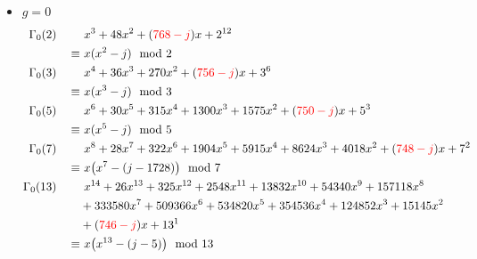 \documentclass{rs}
\theoremstyle{definition}
\theoremstyle{remark}
\newcommand{\md}{~~{\rm mod}~}
\newcommand{\G}{\Gamma}
\renewcommand{\=}{\approx}
\renewcommand{\-}{\sim}
\newcommand{\rd}[1]{{\textcolor{red}{#1}}}
\numberwithin{equation}{section}
\begin{document}
\begin{itemize}
 \item $g = 0$ 
 \[
  \begin{split}
    \G_0(2) \qquad & ~ x^3+48 x^2+(\rd{768-j}) x+2^{12} \\
            \equiv & ~ x (x^2 - j) \md 2 \\
    \G_0(3) \qquad & ~ x^4+36 x^3+270 x^2+(\rd{756-j}) x+3^6 \\
            \equiv & ~ x (x^3 - j) \md 3 \\
    \G_0(5) \qquad & ~ x^6+30 x^5+315 x^4+1300 x^3+1575 x^2+(\rd{750-j}) x+5^3 \\
            \equiv & ~ x (x^5 - j) \md 5 \\
    \G_0(7) \qquad & ~ x^8+28 x^7+322 x^6+1904 x^5+5915 x^4+8624 x^3+4018 x^2+(\rd{748-j}) x+7^2 \\
            \equiv & ~ x \big(x^7 - (j - 1728)\big) \md 7 \\
   \G_0(13) \qquad & ~ x^{14}+26 x^{13}+325 x^{12}+2548 x^{11}+13832 x^{10}+54340 x^9+157118 x^8 \\
                   & +333580 x^7+509366 x^6+534820 x^5+354536 x^4+124852 x^3+15145 x^2 \\
                   & +(\rd{746-j}) x+13^1 \\
            \equiv & ~ x \big(x^{13} - (j - 5)\big) \md 13 
  \end{split}
 \]


\end{itemize}
\end{document}
